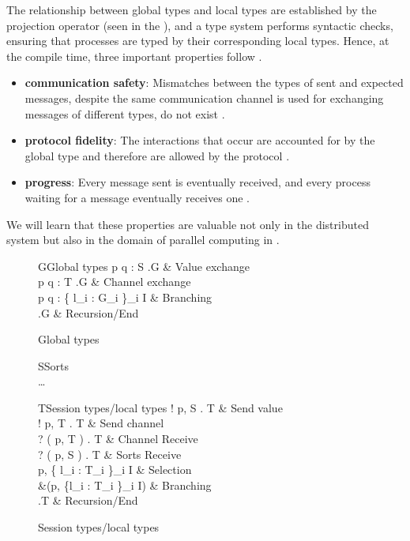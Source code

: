 The relationship between global types and local types are established by the projection operator (seen in the ), and a type system performs syntactic checks, ensuring that processes are typed by their corresponding local types. Hence, at the compile time, three important properties follow \cite{coppoGentleIntroductionMultiparty2015}. 
\begin{itemize}
  \item \textbf{communication safety}: Mismatches between the types of sent and expected messages, despite the same communication channel is used for exchanging messages of different types, do not exist \cite{coppoGentleIntroductionMultiparty2015}. 
  \item \textbf{protocol fidelity}: The interactions that occur are accounted for by the global type and therefore are allowed by the protocol \cite{coppoGentleIntroductionMultiparty2015}.
  \item \textbf{progress}: Every message sent is eventually received, and every process waiting for a message eventually receives one \cite{coppoGentleIntroductionMultiparty2015}.
\end{itemize}
We will learn that these properties are valuable not only in the distributed system but also in the domain of parallel computing in .
\begin{figure}[ht]
\centering
\begin{grammar}{G\Coloneqq}{Global types}
  p \rightarrow q : \langle S \rangle.G & Value exchange \\
  p \rightarrow q : \langle T \rangle.G & Channel exchange \\
  p \rightarrow q : \{ l_i : G_i \}_{i \in I} & Branching \\
  \mu {}.G  \mid {} \mid {} & Recursion/End
\end{grammar}
\caption{Global types} \label{b:mpst:gt}
\end{figure}
\begin{figure}[ht]
\begin{grammar}{S\Coloneqq}{Sorts}
   \mid {} \mid {} \\
  \dots\\
\end{grammar}
\hfill
\begin{grammar}{T\Coloneqq}{Session types/local types}
  ! \langle p, S \rangle . T & Send value\\
  ! \langle p, T \rangle . T & Send channel\\
  ? ( p, T ) . T & Channel Receive\\
  ? ( p, S ) . T & Sorts Receive\\
  \oplus \langle p, \{ l_i : T_i \}_{i \in I} \rangle & Selection \\
  \&(p, \{l_i : T_i \}_{i \in I}) & Branching \\
  \mu {}.T  \mid {} \mid {} & Recursion/End
\end{grammar}
\caption{Session types/local types} \label{b:mpst:lt}
\end{figure}
